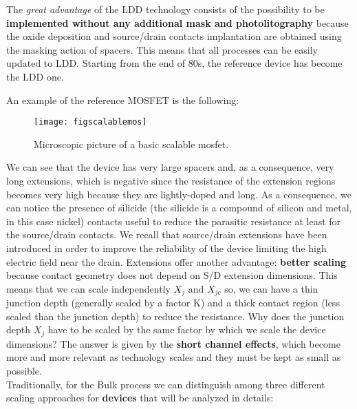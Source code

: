 \documentclass[a4paper, 12pt, twoside, openright]{report}
\begin{document}
The \emph{great advantage} of the LDD technology consists of the possibility to be \textbf{implemented without any additional mask and photolitography} because the oxide deposition and source/drain contacts implantation are obtained using the masking action of spacers. This means that all processes can be easily updated to LDD. Starting from the end of 80s, the reference device has become the LDD one. 

An example of the reference MOSFET is the following:

	\begin{figure}[H]
	\centering
	\texttt{[image: figscalablemos]}
	\caption{Microscopic picture of a basic scalable mosfet.}
	\label{}
	\end{figure}

We can see that the device has very large spacers and, as a consequence, very long extensions, which is negative since the resistance of the extension regions becomes very high because they are lightly-doped and long. As a consequence, we can notice the presence of silicide (the silicide is a compound of silicon and metal, in this case nickel) contacts useful to reduce the parasitic resistance at least for the source/drain contacts. We recall that source/drain extensions have been introduced in order to improve the reliability of the device limiting the high electric field near the drain. Extensions offer another advantage: \textbf{better scaling} because contact geometry does not depend on S/D extension dimensions. This means that we can scale independently $X_{j}$ and $X_{jc}$ so, we can have a thin junction depth (generally scaled by a factor K) and a thick contact region (less scaled than the junction depth) to reduce the resistance. Why does the junction depth $X_{j}$ have to be scaled by the same factor by which we scale the device dimensions? The answer is given by the \textbf{short channel effects}, which become more and more relevant as technology scales and they must be kept as small as possible. \\

Traditionally, for the Bulk process we can distinguish among three different scaling approaches for \textbf{devices} that will be analyzed in details:
\end{document}
